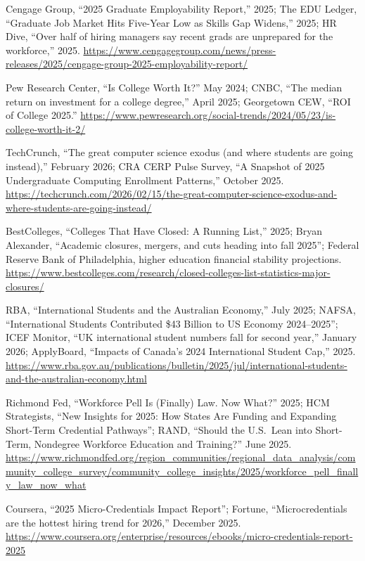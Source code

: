 \documentclass[11pt,a4paper]{article}
\begin{document}
\noindent [92] Cengage Group, ``2025 Graduate Employability Report,'' 2025; The EDU Ledger, ``Graduate Job Market Hits Five-Year Low as Skills Gap Widens,'' 2025; HR Dive, ``Over half of hiring managers say recent grads are unprepared for the workforce,'' 2025. \url{https://www.cengagegroup.com/news/press-releases/2025/cengage-group-2025-employability-report/}

\noindent [93] Pew Research Center, ``Is College Worth It?'' May 2024; CNBC, ``The median return on investment for a college degree,'' April 2025; Georgetown CEW, ``ROI of College 2025.'' \url{https://www.pewresearch.org/social-trends/2024/05/23/is-college-worth-it-2/}

\noindent [94] TechCrunch, ``The great computer science exodus (and where students are going instead),'' February 2026; CRA CERP Pulse Survey, ``A Snapshot of 2025 Undergraduate Computing Enrollment Patterns,'' October 2025. \url{https://techcrunch.com/2026/02/15/the-great-computer-science-exodus-and-where-students-are-going-instead/}

\noindent [95] BestColleges, ``Colleges That Have Closed: A Running List,'' 2025; Bryan Alexander, ``Academic closures, mergers, and cuts heading into fall 2025''; Federal Reserve Bank of Philadelphia, higher education financial stability projections. \url{https://www.bestcolleges.com/research/closed-colleges-list-statistics-major-closures/}

\noindent [96] RBA, ``International Students and the Australian Economy,'' July 2025; NAFSA, ``International Students Contributed \$43 Billion to US Economy 2024--2025''; ICEF Monitor, ``UK international student numbers fall for second year,'' January 2026; ApplyBoard, ``Impacts of Canada's 2024 International Student Cap,'' 2025. \url{https://www.rba.gov.au/publications/bulletin/2025/jul/international-students-and-the-australian-economy.html}

\noindent [97] Richmond Fed, ``Workforce Pell Is (Finally) Law. Now What?'' 2025; HCM Strategists, ``New Insights for 2025: How States Are Funding and Expanding Short-Term Credential Pathways''; RAND, ``Should the U.S.\ Lean into Short-Term, Nondegree Workforce Education and Training?'' June 2025. \url{https://www.richmondfed.org/region_communities/regional_data_analysis/community_college_survey/community_college_insights/2025/workforce_pell_finally_law_now_what}

\noindent [98] Coursera, ``2025 Micro-Credentials Impact Report''; Fortune, ``Microcredentials are the hottest hiring trend for 2026,'' December 2025. \url{https://www.coursera.org/enterprise/resources/ebooks/micro-credentials-report-2025}
\end{document}

